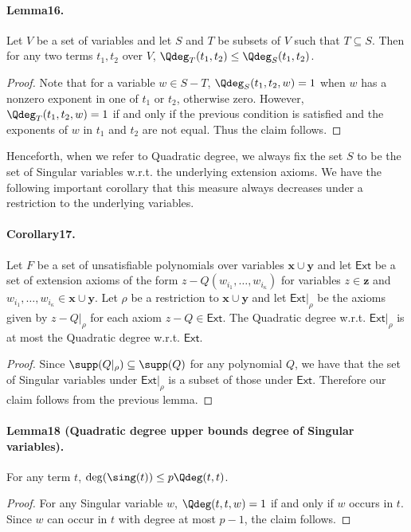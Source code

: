 \paragraph{Lemma16.} Let $V$ be a set of variables and let $S$ and $T$ be subsets of $V$ such that $T\subseteq S$. Then for any two terms $t_1,t_2$ over $V$, $\Qdeg_T(t_1,t_2)\leq\Qdeg_S(t_1,t_2)$.
\begin{proof}
Note that for a variable $w\in S-T$, $\Qdeg_S(t_1,t_2,w)=1$ when $w$ has a nonzero exponent in one of $t_1$ or $t_2$, otherwise zero. However, $\Qdeg_T(t_1,t_2,w)=1$ if and only if the previous condition is satisfied and the exponents of $w$ in $t_1$ and $t_2$ are not equal. Thus the claim follows.
\end{proof}
Henceforth, when we refer to Quadratic degree, we always fix the set $S$ to be the set of Singular variables w.r.t. the underlying extension axioms. We have the following important corollary that this measure always decreases under a restriction to the underlying variables.
\paragraph{Corollary17.} Let $F$ be a set of unsatisfiable polynomials over variables $\mathbf x\cup\mathbf y$ and let $\mathsf{Ext}$ be a set of extension axioms of the form $z-Q(w_{i_1},\ldots,w_{i_{\kappa}})$ for variables $z\in\mathbf z$ and $w_{i_1},\ldots,w_{i_{\kappa}}\in\mathbf x\cup\mathbf y$. Let $\rho$ be a restriction to $\mathbf x\cup\mathbf y$ and let $\mathsf{Ext}|_{\rho}$ be the axioms given by $z-Q|_{\rho}$ for each axiom $z-Q\in\mathsf{Ext}$. The Quadratic degree w.r.t. $\mathsf{Ext}|_{\rho}$ is at most the Quadratic degree w.r.t. $\mathsf{Ext}$.
\begin{proof}
Since $\supp(Q|_{\rho})\subseteq\supp(Q)$ for any polynomial $Q$, we have that the set of Singular variables under $\mathsf{Ext}|_{\rho}$ is a subset of those under $\mathsf{Ext}$. Therefore our claim follows from the previous lemma.
\end{proof}
\paragraph{Lemma18 (Quadratic degree upper bounds degree of Singular variables).} For any term $t$, $\deg(\sing(t))\leq p\Qdeg(t,t)$.
\begin{proof}
For any Singular variable $w$, $\Qdeg(t,t,w)=1$ if and only if $w$ occurs in $t$. Since $w$ can occur in $t$ with degree at most $p-1$, the claim follows.
\end{proof}
